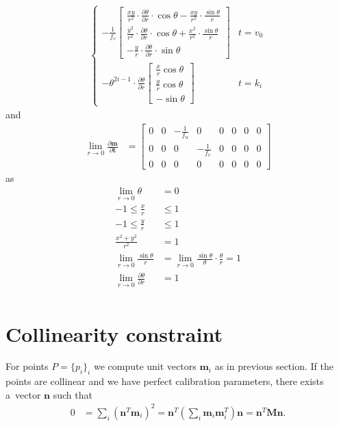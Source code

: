 \documentclass[12pt,a4paper]{amsart}
\renewcommand{\v}[1]{\mathbf{#1}}
\newcommand{\ddd}[2]{\frac{\partial #1}{\partial #2}}
\begin{document}
\begin{align*}
\begin{cases}
          -\frac{1}{f_v} \left[ \begin{array}{c}
            \frac{xy}{r^2}  \cdot \ddd{\theta}{r} \cdot \cos\theta - \frac{xy}{r^2}  \cdot \frac{\sin\theta}{r} \\
            \frac{y^2}{r^2} \cdot \ddd{\theta}{r} \cdot \cos\theta + \frac{x^2}{r^2} \cdot \frac{\sin\theta}{r} \\
           -\frac{y}{r} \cdot \ddd{\theta}{r} \cdot \sin\theta
          \end{array} \right] & t = v_0 \\
          -\theta^{2i-1} \cdot \ddd{\theta}{r} \left[ \begin{array}{c}
            \frac{x}{r}\cos\theta \\
            \frac{y}{r}\cos\theta \\
            -\sin\theta
          \end{array} \right] & t = k_i
        \end{cases}
\end{align*}
and
\begin{align*}
\lim_{r \to 0} \ddd{\v{m}}{\v{t}} & = 
  \left[ \begin{array}{cccccccc}
    0 & 0 & -\frac{1}{f_u} & 0 & 0 & 0 & 0 & 0 \\
    0 & 0 & 0 & -\frac{1}{f_v} & 0 & 0 & 0 & 0 \\
    0 & 0 & 0 & 0 & 0 & 0 & 0 & 0
  \end{array} \right]
\end{align*}
as
\begin{align*}
  \lim_{r \to 0} \theta & = 0 \\
  -1 \leq \frac{x}{r} & \leq 1 \\
  -1 \leq \frac{y}{r} & \leq 1 \\
  \frac{x^2 + y^2}{r^2} & = 1 \\
  \lim_{r \to 0} \frac{\sin\theta}{r} & = \lim_{r \to 0} \frac{\sin\theta}{\theta} \cdot \frac{\theta}{r} = 1 \\
  \lim_{r \to 0} \ddd{\theta}{r} & = 1 \\
\end{align*}


\section{Collinearity constraint}

For points $P = \{p_i\}_i$ we compute unit vectors $\v{m}_i$ as in previous section.
If the points are collinear and we have perfect calibration parameters, there exists a~vector $\v{n}$ such that
\begin{align*}
0 & = \sum_i (\v{n}^T \v{m}_i)^2 = \v{n}^T \left( \sum_i \v{m}_i \v{m}_i^T \right) \v{n} = \v{n}^T \v{M} \v{n}.
\end{align*}
\end{document}
